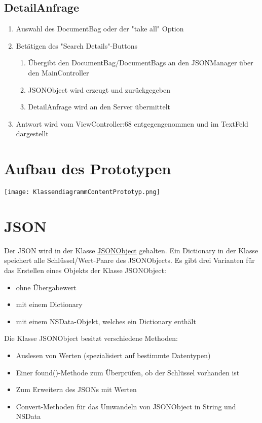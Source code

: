 \subsection{DetailAnfrage}
    \begin{enumerate}
      \item Auswahl des DocumentBag oder der "take all" Option
      \item Betätigen des "Search Details"-Buttons
	\begin{enumerate}
	  \item Übergibt den DocumentBag/DocumentBags an den JSONManager über den MainController
	  \item JSONObject wird erzeugt und zurückgegeben
	  \item DetailAnfrage wird an den Server übermittelt
	\end{enumerate}
      \item Antwort wird vom ViewController:68 entgegengenommen und im TextFeld dargestellt
    \end{enumerate}
\section{Aufbau des Prototypen}

\texttt{[image: KlassendiagrammContentPrototyp.png]}
\pagebreak
\section{JSON}

Der JSON wird in der Klasse \href{https://github.com/SECH-Tag-EEXCESS-Browser/iOSX-App/blob/master/Team%20Content/Demos/JSON/Sech/Sech/Json.swift}{JSONObject} 
gehalten. Ein Dictionary in der Klasse speichert alle Schlüssel/Wert-Paare des JSONObjects.
Es gibt drei Varianten für das Erstellen eines Objekts der Klasse JSONObject:
\begin{itemize}
\item ohne Übergabewert
\item mit einem Dictionary
\item mit einem NSData-Objekt, welches ein Dictionary enthält
\end{itemize}

Die Klasse JSONObject besitzt verschiedene Methoden:
\begin{itemize}
\item Auslesen von Werten (spezialisiert auf bestimmte Datentypen)
\item Einer found()-Methode zum Überprüfen, ob der Schlüssel vorhanden ist
\item Zum Erweitern des JSONs mit Werten
\item Convert-Methoden für das Umwandeln von JSONObject in String und NSData
\end{itemize}

